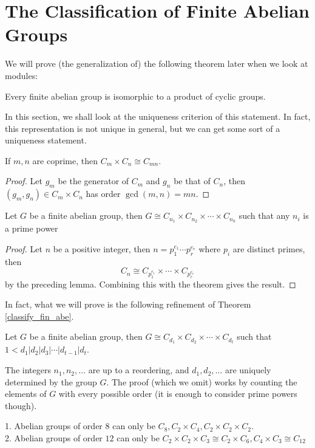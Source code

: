 \section{The Classification of Finite Abelian Groups}
We will prove (the generalization of) the following theorem later when we look at modules:
\begin{theorem}\label{classify_fin_abe}
    Every finite abelian group is isomorphic to a product of cyclic groups.
\end{theorem}
In this section, we shall look at the uniqueness criterion of this statement.
In fact, this representation is not unique in general, but we can get some sort of a uniqueness statement.
\begin{lemma}
    If $m,n$ are coprime, then $C_m\times C_n\cong C_{mn}$.
\end{lemma}
\begin{proof}
    Let $g_m$ be the generator of $C_m$ and $g_n$ be that of $C_n$, then $(g_m,g_n)\in C_m\times C_n$ has order $\gcd(m,n)=mn$.
\end{proof}
\begin{corollary}
    Let $G$ be a finite abelian group, then $G\cong C_{n_1}\times C_{n_2}\times\cdots\times C_{n_k}$ such that any $n_i$ is a prime power
\end{corollary}
\begin{proof}
    Let $n$ be a positive integer, then $n=p_1^{e_1}\cdots p_r^{e_r}$ where $p_i$ are distinct primes, then
    $$C_n\cong C_{p_1^{e_1}}\times \cdots\times C_{p_r^{e_r}}$$
    by the preceding lemma.
    Combining this with the theorem gives the result.
\end{proof}
In fact, what we will prove is the following refinement of Theorem \ref{classify_fin_abe}.
\begin{theorem}\label{fin_abe_struct}
    Let $G$ be a finite abelian group, then $G\cong C_{d_1}\times C_{d_2}\times\cdots\times C_{d_t}$ such that $1<d_1|d_2|d_3|\cdots|d_{t-1}|d_t$.
\end{theorem}
\begin{remark}
    The integers $n_1,n_2,\ldots$ are up to a reordering, and $d_1,d_2,\ldots$ are uniquely determined by the group $G$.
    The proof (which we omit) works by counting the elements of $G$ with every possible order (it is enough to consider prime powers though).
\end{remark}
\begin{example}
    1. Abelian groups of order $8$ can only be $C_8,C_2\times C_4,C_2\times C_2\times C_2$.\\
    2. Abelian groups of order $12$ can only be $C_2\times C_2\times C_3\cong C_2\times C_6,C_4\times C_3\cong C_{12}$
\end{example}
